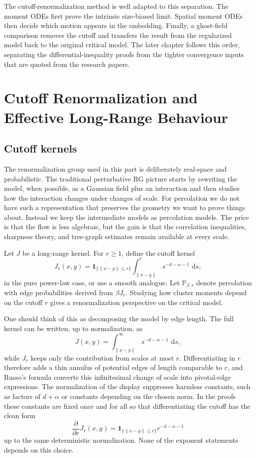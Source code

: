 \documentclass[11pt,reqno]{book}
\numberwithin{equation}{chapter}
\theoremstyle{plain}
\theoremstyle{definition}
\theoremstyle{remark}
\newcommand{\1}{\mathbf 1}
\newcommand{\norm}[1]{\lVert #1\rVert}
\newcommand{\dd}{\,\mathrm d}
\begin{document}
The cutoff-renormalization method is well adapted to this separation. The moment ODEs first prove the intrinsic size-biased limit. Spatial moment ODEs then decide which motion appears in the embedding. Finally, a ghost-field comparison removes the cutoff and transfers the result from the regularized model back to the original critical model. The later chapter follows this order, separating the differential-inequality proofs from the tighter convergence inputs that are quoted from the research papers.

\chapter[Cutoff Renormalization]{Cutoff Renormalization and Effective Long-Range Behaviour}

\section{Cutoff kernels}

The renormalization group used in this part is deliberately real-space and probabilistic. The traditional perturbative RG picture starts by rewriting the model, when possible, as a Gaussian field plus an interaction and then studies how the interaction changes under changes of scale. For percolation we do not have such a representation that preserves the geometry we want to prove things about. Instead we keep the intermediate models as percolation models. The price is that the flow is less algebraic, but the gain is that the correlation inequalities, sharpness theory, and tree-graph estimates remain available at every scale.

Let $J$ be a long-range kernel. For $r\geq 1$, define the cutoff kernel
\[
  J_r(x,y)=
  \mathbf 1_{\{\norm{x-y}\leq r\}}
  \int_{\norm{x-y}}^r s^{-d-\alpha-1}\,\dd s,
\]
in the pure power-law case, or use a smooth analogue. Let $\mathbb P_{\beta,r}$ denote percolation with edge probabilities derived from $\beta J_r$. Studying how cluster moments depend on the cutoff $r$ gives a renormalization perspective on the critical model.

One should think of this as decomposing the model by edge length. The full kernel can be written, up to normalization, as
\[
  J(x,y)=\int_{\norm{x-y}}^\infty s^{-d-\alpha-1}\,\dd s,
\]
while $J_r$ keeps only the contribution from scales at most $r$. Differentiating in $r$ therefore adds a thin annulus of potential edges of length comparable to $r$, and Russo's formula converts this infinitesimal change of scale into pivotal-edge expressions. The normalization of the display suppresses harmless constants, such as factors of $d+\alpha$ or constants depending on the chosen norm. In the proofs these constants are fixed once and for all so that differentiating the cutoff has the clean form
\[
  \frac{\partial}{\partial r}J_r(x,y)
  =
  \mathbf 1_{\{\norm{x-y}\leq r\}}r^{-d-\alpha-1}
\]
up to the same deterministic normalization. None of the exponent statements depends on this choice.
\end{document}
